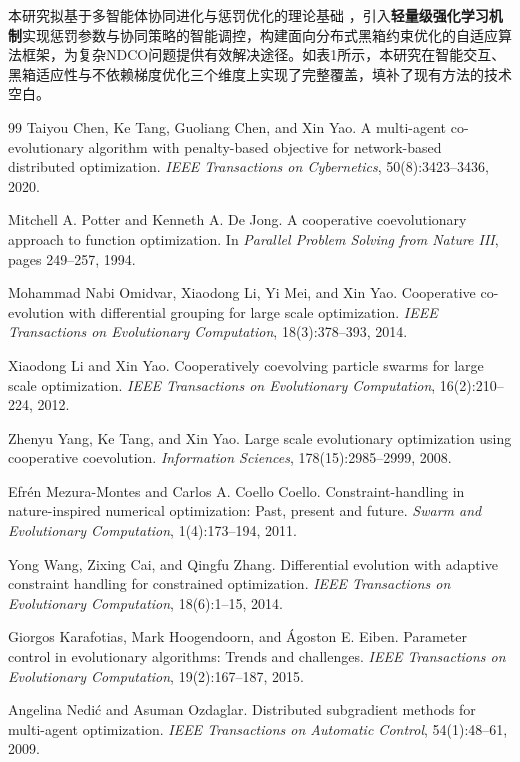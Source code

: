 \begin{titlepage}
本研究拟基于多智能体协同进化与惩罚优化的理论基础 \cite{chen2020}，引入\textbf{轻量级强化学习机制}实现惩罚参数与协同策略的智能调控，构建面向分布式黑箱约束优化的自适应算法框架，为复杂NDCO问题提供有效解决途径。如表1所示，本研究在智能交互、黑箱适应性与不依赖梯度优化三个维度上实现了完整覆盖，填补了现有方法的技术空白。

\begin{thebibliography}{99}
Taiyou Chen, Ke Tang, Guoliang Chen, and Xin Yao.
A multi-agent co-evolutionary algorithm with penalty-based objective
for network-based distributed optimization.
\emph{IEEE Transactions on Cybernetics}, 50(8):3423--3436, 2020.

Mitchell A. Potter and Kenneth A. De Jong.
A cooperative coevolutionary approach to function optimization.
In \emph{Parallel Problem Solving from Nature III}, pages 249--257, 1994.

Mohammad Nabi Omidvar, Xiaodong Li, Yi Mei, and Xin Yao.
Cooperative co-evolution with differential grouping for large scale optimization.
\emph{IEEE Transactions on Evolutionary Computation}, 18(3):378--393, 2014.

Xiaodong Li and Xin Yao.
Cooperatively coevolving particle swarms for large scale optimization.
\emph{IEEE Transactions on Evolutionary Computation}, 16(2):210--224, 2012.

Zhenyu Yang, Ke Tang, and Xin Yao.
Large scale evolutionary optimization using cooperative coevolution.
\emph{Information Sciences}, 178(15):2985--2999, 2008.

Efr\'en Mezura-Montes and Carlos A. Coello Coello.
Constraint-handling in nature-inspired numerical optimization:
Past, present and future.
\emph{Swarm and Evolutionary Computation}, 1(4):173--194, 2011.

Yong Wang, Zixing Cai, and Qingfu Zhang.
Differential evolution with adaptive constraint handling for constrained optimization.
\emph{IEEE Transactions on Evolutionary Computation}, 18(6):1--15, 2014.

Giorgos Karafotias, Mark Hoogendoorn, and \'Agoston E. Eiben.
Parameter control in evolutionary algorithms: Trends and challenges.
\emph{IEEE Transactions on Evolutionary Computation}, 19(2):167--187, 2015.

Angelina Nedi\'c and Asuman Ozdaglar.
Distributed subgradient methods for multi-agent optimization.
\emph{IEEE Transactions on Automatic Control}, 54(1):48--61, 2009.


\end{thebibliography}
\end{titlepage}
